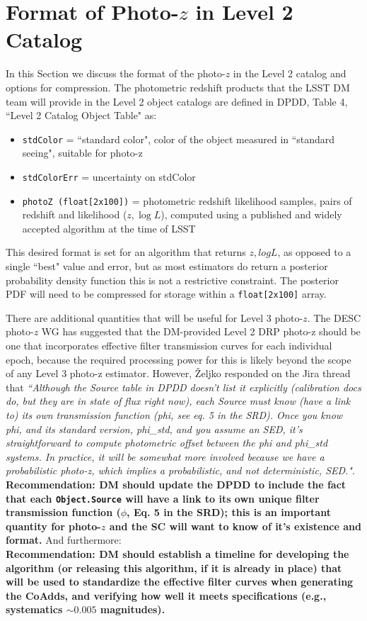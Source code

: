 \documentclass[DM,lsstdraft,toc]{lsstdoc}
\begin{document}
\section{Format of Photo-$z$ in Level 2 Catalog}\label{sec:format}

In this Section we discuss the format of the photo-$z$ in the Level 2 catalog and options for compression. The photometric redshift products that the LSST DM team will provide in the Level 2 object catalogs are defined in DPDD, Table 4, ``Level 2 Catalog Object Table" as:
\begin{itemize}
\item \texttt{stdColor} = ``standard color", color of the object measured in ``standard seeing", suitable for photo-z
\item \texttt{stdColorErr} = uncertainty on stdColor
\item \texttt{photoZ (float[2x100])} = photometric redshift likelihood samples, pairs of redshift and likelihood ($z,\log{L}$), computed using a published and widely accepted algorithm at the time of LSST
\end{itemize}

\noindent This desired format is set for an algorithm that returns $z,logL$, as opposed to a single ``best" value and error, but as most estimators do return a posterior probability density function this is not a restrictive constraint. The posterior PDF will need to be compressed for storage within a \texttt{float[2x100]} array.

There are additional quantities that will be useful for Level 3 photo-$z$. The DESC photo-$z$ WG has suggested that the DM-provided Level 2 DRP photo-z should be one that incorporates effective filter transmission curves for each individual epoch, because the required processing power for this is likely beyond the scope of any Level 3 photo-z estimator. However, \v{Z}eljko responded on the Jira thread that \textit{``Although the Source table in DPDD doesn't list it explicitly (calibration docs do, but they are in state of flux right now), each Source must know (have a link to) its own transmission function (phi, see eq. 5 in the SRD). Once you know phi, and its standard version, phi\_std, and you assume an SED, it's straightforward to compute photometric offset between the phi and phi\_std systems. In practice, it will be somewhat more involved because we have a probabilistic photo-z, which implies a probabilistic, and not deterministic, SED."}. \\
\textbf{Recommendation:  DM should update the DPDD to include the fact that each \texttt{Object.Source} will have a link to its own unique filter transmission function ($\phi$, Eq. 5 in the SRD); this is an important quantity for photo-$z$ and the SC will want to know of it's existence and format.}
And furthermore: \\
\textbf{Recommendation: DM should establish a timeline for developing the algorithm (or releasing this algorithm, if it is already in place) that will be used to standardize the effective filter curves when generating the CoAdds, and verifying how well it meets specifications (e.g., systematics $\sim 0.005$ magnitudes).}
\end{document}
